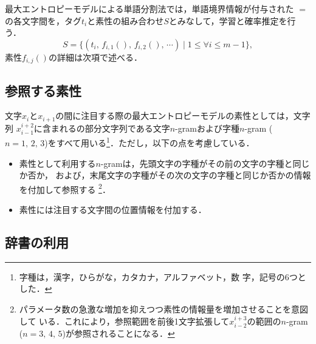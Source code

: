 \documentclass[japanese]{jnlp_JS2.0}
\def\Bdma#1{}
\def\Conc#1#2{}
\begin{document}
最大エントロピーモデルによる単語分割法では，単語境界情報が付与された $\Bdma{x} =
\Conc{x}{m}$の各文字間を，タグ$t_{i}$と素性の組み合わせ$S$とみなして，学習と確率推定を行
う．
\begin{displaymath}
  S = \{(t_{i},\,f_{i,1}(\Bdma{x}),\,f_{i,2}(\Bdma{x}),\,\cdots)
  \;|\;1 \leq \forall i \leq m-1\},
\end{displaymath}
素性$f_{i,j}(\Bdma{x})$の詳細は次項で述べる．


\subsection{参照する素性}


文字$x_{i}$と$x_{i+1}$の間に注目する際の最大エントロピーモデルの素性としては，文字列
$x_{i-1}^{i+2}$に含まれるの部分文字列である文字$n$-gramおよび字種$n$-gram ($n = 1,\,
2,\,3$)をすべて用いる\footnote{字種は，漢字，ひらがな，カタカナ，アルファベット，数
  字，記号の6つとした．}．ただし，以下の点を考慮している．
\begin{itemize}

\item 素性として利用する$n$-gramは，先頭文字の字種がその前の文字の字種と同じか否か，
  および，末尾文字の字種がその次の文字の字種と同じか否かの情報を付加して参照する
  \footnote{パラメータ数の急激な増加を抑えつつ素性の情報量を増加させることを意図して
  いる．これにより，参照範囲を前後1文字拡張して$x_{i-2}^{i+3}$の範囲の$n$-gram ($n =
  3,\,4,\,5$)が参照されることになる．}．

\item 素性には注目する文字間の位置情報を付加する．

\end{itemize}


\subsection{辞書の利用}
\end{document}
